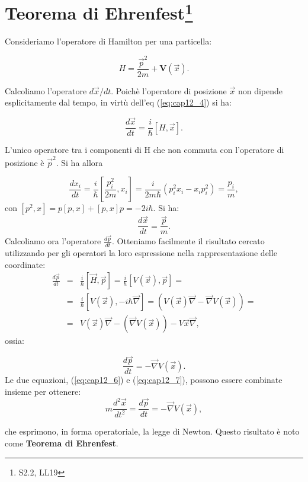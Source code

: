 \documentclass[a4paper,12pt,oneside]{book}
\begin{document}
\section[Teorema di Ehrenfest]{Teorema di Ehrenfest\footnote{S2.2, LL19}}

Consideriamo l'operatore di Hamilton per una particella:

\begin{equation}
H= \frac{\vec{p}^2}{2m} + \textbf{V}(\vec{x}).
\end{equation}

Calcoliamo l'operatore $d\vec{x}/dt$. Poichè l'operatore di posizione $\vec{x}$ non dipende esplicitamente dal tempo, in virtù dell'eq (\ref{eq:cap12_4}) si ha:

\begin{equation}
\frac{d\vec{x}}{dt}= \frac{i}{\hbar}[H,\vec{x}].
\end{equation}

L'unico operatore tra i componenti di H che non commuta con l'operatore di posizione è $\vec{p}^2$. Si ha allora 

\begin{equation}
\frac{dx_i}{dt}=\frac{i}{\hbar} \left[ \frac{p_i^2}{2m},x_i \right]=\frac{i}{2m\hbar}(p_i^2x_i-x_ip_i^2)=\frac{p_i}{m},
\end{equation}
con $[p^2,x]=p[p,x]+[p,x]p=-2i\hbar$. Si ha:
\begin{equation}
   	\label{eq:cap12_6}
	\frac{d\vec{x}}{dt}=\frac{\vec{p}}{m}.
\end{equation}
Calcoliamo ora l'operatore $\displaystyle{\frac{d\vec{p}}{dt}}$. Otteniamo facilmente il risultato cercato utilizzando per gli operatori la loro espressione nella rappresentazione delle coordinate:\\
\begin{eqnarray}
	\frac{d\vec{p}}{dt}&=&\frac{i}{\hbar}[\vec{H},\vec{p}]=\frac{i}{\hbar}[V(\vec{x}),\vec{p}]= \nonumber\\
	&=&\frac{i}{\hbar}[V(\vec{x}),-i\hbar\vec{\nabla}]=(V(\vec{x})\vec{\nabla}-\vec{\nabla}V(\vec{x}))= \nonumber \\
	&=&V(\vec{x})\vec{\nabla}-(\vec{\nabla}V(\vec{x}))-V	\vec{x}\vec{\nabla},
\end{eqnarray}
ossia:

\begin{equation}
\label{eq:cap12_7}
\frac{d\vec{p}}{dt}=-\vec{\nabla}V(\vec{x}).
\end{equation}
Le due equazioni, (\ref{eq:cap12_6}) e (\ref{eq:cap12_7}), possono essere combinate insieme per ottenere:\\
\begin{equation}
m\frac{d^2\vec{x}}{dt^2}=\frac{d\vec{p}}{dt}=-\vec{\nabla}V(\vec{x}),
\end{equation}

che esprimono, in forma operatoriale, la legge di Newton. Questo risultato è noto come \textbf{Teorema di Ehrenfest}. 
\end{document}
